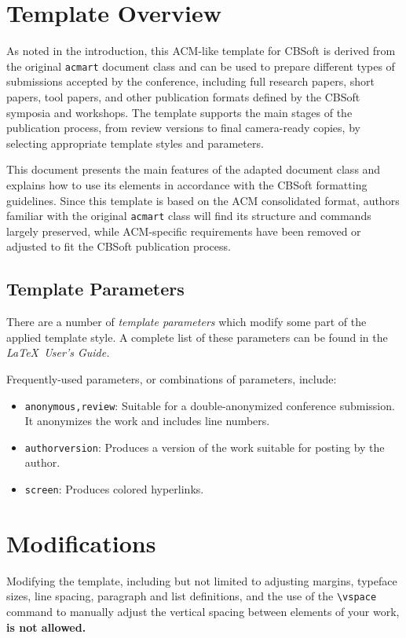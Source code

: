 \documentclass[sigconf]{acmart}
\begin{document}
\section{Template Overview}

As noted in the introduction, this ACM-like template for CBSoft is derived from the original \verb|acmart| document class and can be used to prepare different types of submissions accepted by the conference, including full research papers, short papers, tool papers, and other publication formats defined by the CBSoft symposia and workshops. The template supports the main stages of the publication process, from review versions to final camera-ready copies, by selecting appropriate template styles and parameters.

This document presents the main features of the adapted document class and explains how to use its elements in accordance with the CBSoft formatting guidelines. Since this template is based on the ACM consolidated format, authors familiar with the original \verb|acmart| class will find its structure and commands largely preserved, while ACM-specific requirements have been removed or adjusted to fit the CBSoft publication process.

\subsection{Template Parameters}

There are a number of {\itshape template parameters}
which modify some part of the applied template style. A complete list
of these parameters can be found in the {\itshape \LaTeX\ User's Guide.}

Frequently-used parameters, or combinations of parameters, include:
\begin{itemize}
\item {\texttt{anonymous,review}}: Suitable for a double-anonymized conference submission. It anonymizes the work and includes line numbers.
\item{\texttt{authorversion}}: Produces a version of the work suitable for posting by the author.
\item{\texttt{screen}}: Produces colored hyperlinks.
\end{itemize}


\section{Modifications}

Modifying the template, including but not limited to adjusting
margins, typeface sizes, line spacing, paragraph and list definitions,
and the use of the \verb|\vspace| command to manually adjust the
vertical spacing between elements of your work, \textbf{is not allowed.}
\end{document}
